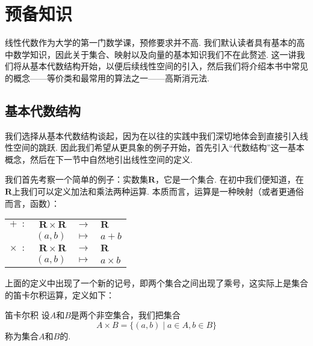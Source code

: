 \chapter{预备知识}

线性代数作为大学的第一门数学课，预修要求并不高. 我们默认读者具有基本的高中数学知识，因此关于集合、映射以及向量的基本知识我们不在此赘述. 这一讲我们将从基本代数结构开始，以便后续线性空间的引入，然后我们将介绍本书中常见的概念——等价类和最常用的算法之一——高斯消元法.

\section{基本代数结构}

我们选择从基本代数结构谈起，因为在以往的实践中我们深切地体会到直接引入线性空间的跳跃. 因此我们希望从更具象的例子开始，首先引入``代数结构''这一基本概念，然后在下一节中自然地引出线性空间的定义.

我们首先考察一个简单的例子：实数集$\mathbf{R}$，它是一个集合. 在初中我们便知道，在$\mathbf{R}$上我们可以定义加法和乘法两种运算. 本质而言，运算是一种映射（或者更通俗而言，函数）：

\begin{center}
    \begin{tabular}{rrcl}
        $+\enspace\colon$      & $\mathbf{R}\times\mathbf{R}$ & $\to$     & $\mathbf{R}$ \\
                               & $(a,b)$                      & $\mapsto$ & $a+b$        \\
        $\times\enspace\colon$ & $\mathbf{R}\times\mathbf{R}$ & $\to$     & $\mathbf{R}$ \\
                               & $(a,b)$                      & $\mapsto$ & $a\times b$
    \end{tabular}
\end{center}

上面的定义中出现了一个新的记号，即两个集合之间出现了乘号，这实际上是集合的笛卡尔积运算，定义如下：

\begin{definition}{笛卡尔积}{} 
    设$A$和$B$是两个非空集合，我们把集合
    \[A\times B=\{(a,b) \mid a\in A, b\in B\}\]
    称为集合$A$和$B$的.
\end{definition}

